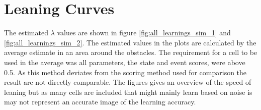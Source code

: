 \chapter{Leaning Curves}
\label{appendix:learning_curves}
The estimated $\lambda$ values are shown in figure \ref{fig:all_learnings_sim_1} and \ref{fig:all_learnings_sim_2}. The estimated values in the plots are calculated by the average estimate in an area around the obstacles. The requirement for a cell to be used in the average was all parameters, the state and event scores, were above 0.5. As this method deviates from the scoring method used for comparison the result are not directly comparable.
The figures gives an overview of the speed of leaning but as many cells are included that might mainly learn based on noise is may not represent an accurate image of the learning accuracy.

